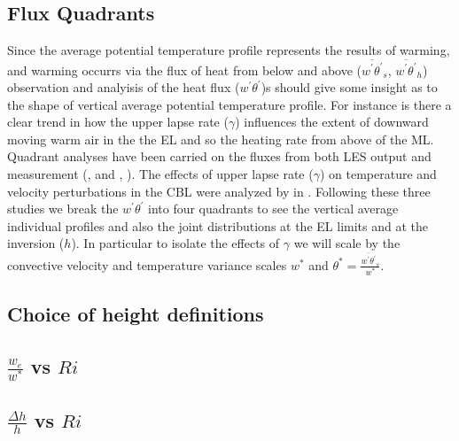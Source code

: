 \subsection{Flux Quadrants}

Since the average potential temperature profile represents the results of warming, and warming occurrs via the flux of heat from below and above ($\overline{w^{'}\theta^{'}}_{s}$, $\overline{w^{'}\theta^{'}}_{h}$) observation and analyisis of the heat flux ($w^{'}\theta^{'}$)s should give some insight as to the shape of vertical average potential temperature profile.  For instance is there a clear trend in how the upper lapse rate ($\gamma$) influences the extent of downward moving warm air in the the \acs{EL} and so the heating rate from above of the \acs{ML}. Quadrant analyses have been carried on the fluxes from both LES output and measurement (\citeauthor{SullMoengStev}, \cite{SullMoengStev} and \citeauthor{MahrtPaum}, \cite{MahrtPaum}).  The effects of upper lapse rate ($\gamma$) on temperature and velocity perturbations in the \acs{CBL} were analyzed by \citeauthor{Sorbjan} in \cite{Sorbjan}.  Following these three studies we break the $w^{'}\theta^{'}$ into four quadrants to see the vertical average individual profiles and also the joint distributions at the \acs{EL} limits and at the inversion ($h$).  In particular to isolate the effects of $\gamma$ we will scale by the convective velocity and temperature variance scales $w^{*}$ and $\theta^{*}=\frac{\overline{w^{'}\theta^{'}}_{s}}{w^{*}}$.

\subsection{Choice of height definitions}

\subsection{$\frac{w_{e}}{w^{*}}$ vs $Ri$}

\subsection{$\frac{\Delta h}{h}$ vs $Ri$}

\endinput

Any text after an \endinput is ignored.
You could put scraps here or things in progress.

